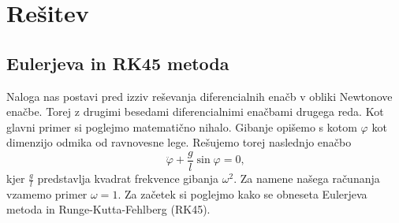 \documentclass{article}
\begin{document}
\section{Rešitev}
\subsection{Eulerjeva in RK45 metoda}
Naloga nas postavi pred izziv reševanja diferencialnih enačb v obliki Newtonove enačbe. Torej z drugimi besedami diferencialnimi enačbami drugega reda. Kot glavni primer si poglejmo matematično nihalo. Gibanje opišemo s kotom $\varphi$ kot dimenzijo odmika od ravnovesne lege. Rešujemo torej naslednjo enačbo
\begin{equation}
	\ddot{\varphi} + \frac{g}{l}\sin{\varphi} = 0\text{,}
\end{equation}
kjer $\frac{g}{l}$ predstavlja kvadrat frekvence gibanja $\omega^2$. Za namene našega računanja vzamemo primer $\omega=1$. Za začetek si poglejmo kako se obneseta Eulerjeva metoda in Runge-Kutta-Fehlberg (RK45). 
\end{document}
